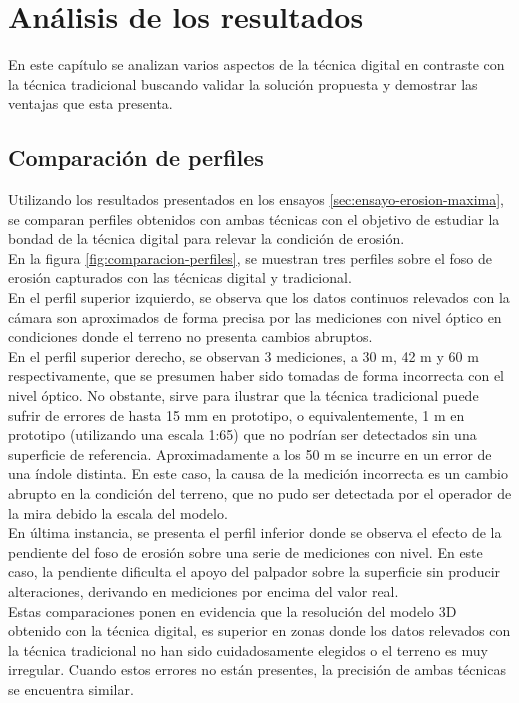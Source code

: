 \chapter{Análisis de los resultados}
En este capítulo se analizan varios aspectos de la técnica digital en contraste con la técnica tradicional buscando validar la solución propuesta y demostrar las ventajas que esta presenta.

\section{Comparación de perfiles}
Utilizando los resultados presentados en los ensayos \ref{sec:ensayo-erosion-maxima}, se comparan perfiles obtenidos con ambas técnicas con el objetivo de estudiar la bondad de la técnica digital para relevar la condición de erosión. \\
En la figura \ref{fig:comparacion-perfiles}, se muestran tres perfiles sobre el foso de erosión capturados con las técnicas digital y tradicional. \\
En el perfil superior izquierdo, se observa que los datos continuos relevados con la cámara son aproximados de forma precisa por las mediciones con nivel óptico en condiciones donde el terreno no presenta cambios abruptos. \\
En el perfil superior derecho, se observan 3 mediciones, a 30 m, 42 m y 60 m respectivamente, que se presumen haber sido tomadas de forma incorrecta con el nivel óptico. No obstante, sirve para ilustrar que la técnica tradicional puede sufrir de errores de hasta 15 mm en prototipo, o equivalentemente, 1 m en prototipo (utilizando una escala 1:65) que no podrían ser detectados sin una superficie de referencia. Aproximadamente a los 50 m se incurre en un error de una índole distinta. En este caso, la causa de la medición incorrecta es un cambio abrupto en la condición del terreno, que no pudo ser detectada por el operador de la mira debido la escala del modelo. \\ 
En última instancia, se presenta el perfil inferior donde se observa el efecto de la pendiente del foso de erosión sobre una serie de mediciones con nivel. En este caso, la pendiente dificulta el apoyo del palpador sobre la superficie sin producir alteraciones, derivando en mediciones por encima del valor real. \\
Estas comparaciones ponen en evidencia que la resolución del modelo 3D obtenido con la técnica digital, es superior en zonas donde los datos relevados con la técnica tradicional no han sido cuidadosamente elegidos o el terreno es muy irregular. Cuando estos errores no están presentes, la precisión de ambas técnicas se encuentra similar.

